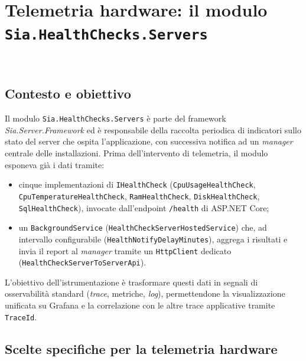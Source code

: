 \chapter{Telemetria hardware: il modulo \texttt{Sia.HealthChecks.Servers}}
\label{cap:telemetria-hardware}

\\

\section{Contesto e obiettivo}

Il modulo \texttt{Sia.HealthChecks.Servers} è parte del framework \emph{Sia.Server.Framework}
ed è responsabile della raccolta periodica di indicatori sullo stato del server che ospita
l'applicazione, con successiva notifica ad un \emph{manager} centrale delle installazioni.
Prima dell'intervento di telemetria, il modulo esponeva già i dati tramite:
\begin{itemize}
    \item cinque implementazioni di \texttt{IHealthCheck} (\texttt{CpuUsageHealthCheck},
        \texttt{CpuTemperatureHealthCheck}, \texttt{RamHealthCheck}, \texttt{DiskHealthCheck},
        \texttt{SqlHealthCheck}), invocate dall'endpoint \texttt{/health} di ASP.NET Core;
    \item un \texttt{BackgroundService} (\texttt{HealthCheckServerHostedService}) che, ad
        intervallo configurabile (\texttt{HealthNotifyDelayMinutes}), aggrega i risultati e
        invia il report al \emph{manager} tramite un \texttt{HttpClient} dedicato
        (\texttt{HealthCheckServerToServerApi}).
\end{itemize}

L'obiettivo dell'istrumentazione è trasformare questi dati in segnali di osservabilità
standard (\emph{trace}, metriche, \emph{log}), permettendone la visualizzazione unificata
su Grafana e la correlazione con le altre trace applicative tramite \texttt{TraceId}.

\section{Scelte specifiche per la telemetria hardware}

